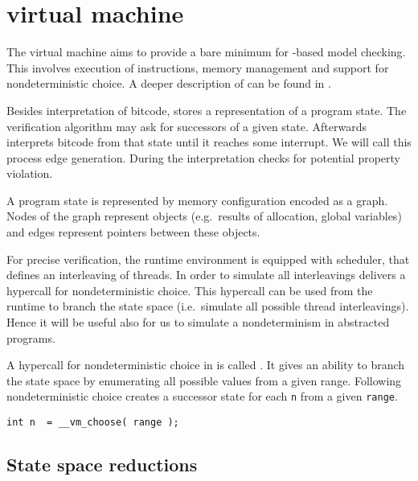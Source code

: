\section{\DIVINE virtual machine}

The \DIVINE virtual machine aims to provide a bare minimum for \LLVM-based
model checking. This involves execution of instructions, memory management and
support for nondeterministic choice. A deeper description of
\DIVM can be found in \cite{RockaiCB17}.

Besides interpretation of \LLVM bitcode, \DIVM stores a representation of a
program state. The verification algorithm may ask \DIVM for successors of a
given state. Afterwards \DIVM interprets \LLVM bitcode from that state
until it reaches some interrupt. We will call this process edge generation.
During the interpretation \DIVM checks for potential property violation.

A program state is represented by memory configuration encoded as a graph.
Nodes of the graph represent objects (e.g.~results of allocation, global
variables) and edges represent pointers between these objects.

For precise verification, the runtime environment is equipped with scheduler,
that defines an interleaving of threads. In order to simulate all interleavings
\DIVM delivers a hypercall for nondeterministic choice. This hypercall can be
used from the runtime to branch the state space (i.e.~simulate all possible
thread interleavings). Hence it will be useful also
for us to simulate a nondeterminism in abstracted programs.

\begin{example}
A hypercall for nondeterministic choice in \DIVM is called .
It gives an ability to branch the state space by enumerating all possible values
from a given range. Following nondeterministic
choice creates a successor state for each \texttt{n} from a given \texttt{range}.

\begin{verbatim}
int n  = __vm_choose( range );
\end{verbatim}

\end{example}
\subsection{State space reductions}


